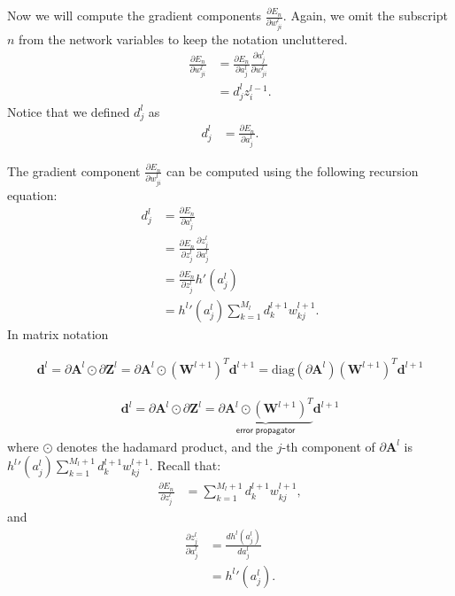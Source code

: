 \documentclass{tufte-handout}
\begin{document}
Now we will compute the gradient components $\frac{\partial E_n}{\partial w_{ji}^l} $. Again, we omit the subscript $n$ from the network variables to keep the notation uncluttered.
\begin{align*}
\frac{\partial E_n}{\partial w_{ji}^l} &= \frac{\partial E_n}{\partial a_j^l}\frac{\partial a_j^l}{\partial w_{ji}^l}\nonumber\\
&=d_{j}^lz_i^{l-1}.
\end{align*}
Notice that we defined $d_{j}^l$ as
\begin{align*}
d_{j}^l &=  \frac{\partial E_n}{\partial a_j^l}.
\end{align*}

The gradient component $\frac{\partial E_n}{\partial w_{ji}^l} $ can be computed using the following recursion equation:
\vspace{0\baselineskip}
\begin{align*}
d_j^l &= \frac{\partial E_n}{\partial a^l_j} \\
&= \frac{\partial E_n}{\partial z^l_j}\frac{\partial z_j^l}{\partial a_j^l}\nonumber\\
&= \frac{\partial E_n}{\partial z^l_j}h'(a_j^l)\nonumber\\
&= {h^l}'(a_j^l) \sum_{k=1}^{M_{l}} d_{k}^{l+1} w_{kj}^{l+1}.
\end{align*}
In matrix notation

\begin{align*}
\mathbf d^l = \partial \mathbf A^l \odot \partial \mathbf Z^l = \partial \mathbf A^l \odot (\mathbf W^{l+1})^T  \mathbf d^{l+1} = \mathrm{diag}( \partial \mathbf A^l )(\mathbf W^{l+1})^T  \mathbf d^{l+1}
\end{align*}

\begin{align*}
\mathbf d^l = \partial \mathbf A^l \odot \partial \mathbf Z^l =  \underbrace{ \partial \mathbf A^l \odot (\mathbf W^{l+1})^T} _{\mathsf{error\; propagator}} \mathbf d^{l+1}
\end{align*}
where $\odot$ denotes the hadamard product, and  the $j$-th component of $\partial \mathbf A^l $  is $ {h^l}'(a_j^l) \sum_{k=1}^{M_{l}+1} d_{k}^{l+1} w_{kj}^{l+1}$.
Recall that:
\begin{align*}
\frac{\partial E_n}{\partial z_j^{l}} &= \sum_{k=1}^{M_{l}+1} d_{k}^{l+1} w_{kj}^{l+1},
\end{align*}
and
\begin{align*}
\frac{\partial z_j^l}{\partial a_j^l} &= \frac{d h^l(a_j^l) }{d a_j^l} \\
&= {h^l}'(a_j^l).
\end{align*}
\end{document}
